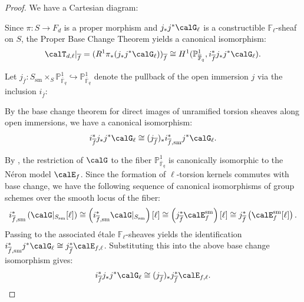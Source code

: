 \begin{proof}
    We have a Cartesian diagram:
    \begin{center}
    \end{center}
    Since $\pi: S \to F_d$ is a proper morphism and $j_* j^* \calG_\ell$ is a constructible $\mathbb{F}_\ell$-sheaf on $S$, the Proper Base Change Theorem yields a canonical isomorphism:
    \[ \calT_{d,\ell}|_{\overline{f}} = (R^1 \pi_* (j_* j^* \calG_\ell))_{\overline{f}} \cong H^1(\mathbb{P}^1_{\overline{\mathbb{F}}_q}, i_{\overline{f}}^* j_* j^* \calG_\ell). \]

    Let $j_{\overline{f}}: S_{\text{sm}} \times_S \mathbb{P}^1_{\overline{\mathbb{F}}_q} \hookrightarrow \mathbb{P}^1_{\overline{\mathbb{F}}_q}$ denote the pullback of the open immersion $j$ via the inclusion $i_{\overline{f}}$:
    \begin{center}
    \end{center}
    By the base change theorem for direct images of unramified torsion sheaves along open immersions, we have a canonical isomorphism:
    \[ i_{\overline{f}}^* j_* j^* \calG_\ell \cong (j_{\overline{f}})_* i_{\overline{f}, \text{sm}}^* j^* \calG_\ell. \]

    By , the restriction of $\calG$ to the fiber $\mathbb{P}^1_{\overline{\mathbb{F}}_q}$ is canonically isomorphic to the N\'eron model $\calE_f$. Since the formation of $\ell$-torsion kernels commutes with base change, we have the following sequence of canonical isomorphisms of group schemes over the smooth locus of the fiber:
    \[
    i_{\overline{f}, \text{sm}}^* \left( \calG|_{S_{\text{sm}}}[\ell] \right) \cong \left( i_{\overline{f}, \text{sm}}^* \calG|_{S_{\text{sm}}} \right)[\ell] \cong \left( j_{\overline{f}}^* \calE_f^{\text{sm}} \right)[\ell] \cong j_{\overline{f}}^* \left( \calE_f^{\text{sm}}[\ell] \right).
    \]
    Passing to the associated \'etale $\mathbb{F}_\ell$-sheaves yields the identification $i_{\overline{f}, \text{sm}}^* j^* \calG_\ell \cong j_{\overline{f}}^* \calE_{f,\ell}$. Substituting this into the above base change isomorphism gives:
    \[ i_{\overline{f}}^* j_* j^* \calG_\ell \cong (j_{\overline{f}})_* j_{\overline{f}}^* \calE_{f,\ell}. \]


\end{proof}
